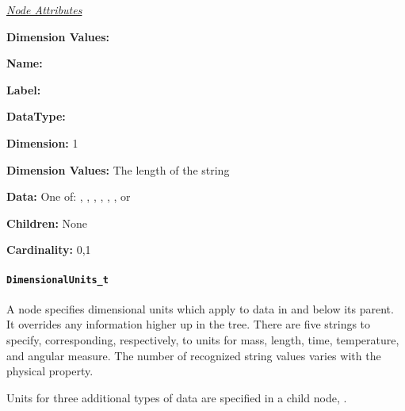 \textit{\uline{Node Attributes}}
\begin{Ventryic}{\textbf{Dimension Values:}}
\raggedright
\item [\textbf{Name:}]
\item [\textbf{Label:}]
\item [\textbf{DataType:}]
\item [\textbf{Dimension:}]
      1
\item [\textbf{Dimension Values:}]
      The length of the string
\item [\textbf{Data:}]
      One of: , ,
      , ,
      ,
      , or 
\item [\textbf{Children:}]
      None
\item [\textbf{Cardinality:}]
      0,1
\end{Ventryic}

\paragraph{\texttt{DimensionalUnits\_t}}

A  node specifies dimensional units
which apply to data in and below its parent.  It overrides any
 information higher up in the tree. There are
five strings to specify, corresponding, respectively, to units for mass,
length, time, temperature, and angular measure. The number of recognized
string values varies with the physical property.

Units for three additional types of data are specified in a child node,
.

